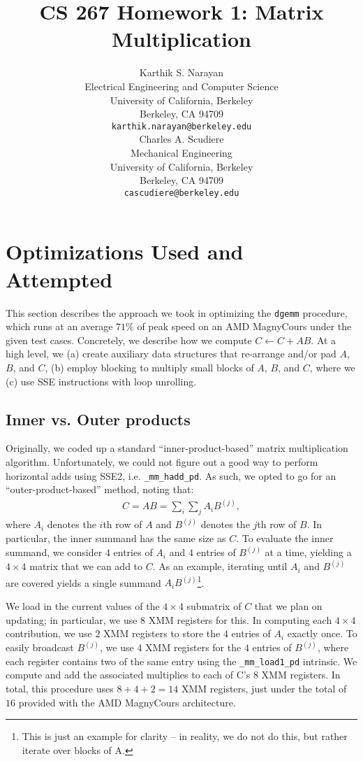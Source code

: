 \documentclass{article} %
\title{CS 267 Homework 1: Matrix Multiplication}
\author{
Karthik S. Narayan \\
Electrical Engineering and Computer Science\\
University of California, Berkeley\\
Berkeley, CA 94709 \\
\texttt{karthik.narayan@berkeley.edu} \\
\And
Charles A. Scudiere \\
Mechanical Engineering\\
University of California, Berkeley\\
Berkeley, CA 94709 \\
\texttt{cascudiere@berkeley.edu} \\
}
\begin{document}
\newcommand{\dgemm}{\texttt{dgemm}}

\newcommand\todo{\textcolor{red}{TODO}}
\newcommand\tocite{\textcolor{red}{CITE}}

\maketitle

\section{Optimizations Used and Attempted}
This section describes the approach we took in optimizing the \dgemm\; procedure,
which runs at an average $71\%$ of peak speed on an AMD MagnyCours under the
given test cases.
Concretely, we describe how we compute $C \leftarrow C + AB$. At a high level,
we (a) create auxiliary data structures that re-arrange and/or pad $A$, $B$,
and $C$, (b) employ blocking to multiply small blocks of $A$, $B$, and $C$,
where we (c) use SSE instructions with loop unrolling.

\subsection{Inner vs. Outer products}
\label{sec:ioproducts}
Originally, we coded up a standard ``inner-product-based'' matrix multiplication
algorithm. Unfortunately, we could not figure out a good way to perform
horizontal adds using SSE2, i.e. \texttt{\_mm\_hadd\_pd}. As such, we opted to go
for an ``outer-product-based'' method, noting that:
\begin{align}
  \label{eq:matmul}
  C = AB = \sum_{i}\sum_{j}A_i B^{(j)},
\end{align}
where $A_i$ denotes the $i$th row of $A$ and $B^{(j)}$ denotes the $j$th row of
$B$. In particular, the inner summand has the same size as $C$. To evaluate the
inner summand, we consider $4$ entries of $A_i$ and $4$ entries of $B^{(j)}$ at
a time, yielding a $4\times 4$ matrix that we can add to $C$. As an example,
iterating until $A_i$ and $B^{(j)}$ are covered yields a single summand
$A_i B^{(j)}$\footnote{This is just an example for clarity -- in reality, we do
  not do this, but rather iterate over blocks of A.}.

We load in the current values of the $4\times 4$ submatrix of $C$ that we
plan on updating; in particular, we use $8$ XMM registers for this.
In computing each $4\times 4$ contribution, we use $2$ XMM registers to store
the $4$ entries of $A_i$ exactly once. To easily broadcast $B^{(j)}$, we use
$4$ XMM registers for the $4$ entries of $B^{(j)}$, where each register contains
two of the same entry using the \texttt{\_mm\_load1\_pd} intrinsic. We compute
and add the associated multiplies to each of C's $8$ XMM registers. In total,
this procedure uses $8 + 4 + 2 = 14$ XMM registers, just under the total of $16$
provided with the AMD MagnyCours architecture.
\end{document}
